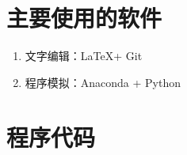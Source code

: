 
%


\appendix


\section{主要使用的软件}

\begin{enumerate}
    \item 文字编辑：\LaTeX + Git
    \item 程序模拟：Anaconda + Python
\end{enumerate}


\section{程序代码}


